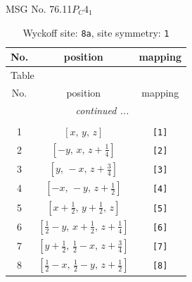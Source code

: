 \documentclass[fleqn,8pt]{jsarticle}
\begin{document}
\setcounter{MaxMatrixCols}{32}

\renewcommand{\tablename}{Table~}
\renewcommand{\figurename}{Figure~}
\begin{center}
\LARGE
MSG No. 76.11\quad$P_{C}4_{1}$
\end{center}
\renewcommand{\arraystretch}{1.2}
\begin{longtable}{ccc}
\caption{Wyckoff site: {\tt 8a}, site symmetry: {\tt 1}}
 \\
 \hline \hline
No. & position & mapping \\ \hline \endfirsthead

\multicolumn{2}{l}{\tablename\ \thetable{}} \\
 \hline \hline
No. & position & mapping \\ \hline \endhead

 \hline \hline
\multicolumn{2}{r}{\footnotesize\it continued ...} \\ \endfoot

 \hline \hline
\multicolumn{2}{r}{} \\ \endlastfoot

1 & $\left[ x,\, y,\, z \right]$ & {\tt [1]} \\ \hline
2 & $\left[ - y,\, x,\, z + \frac{1}{4} \right]$ & {\tt [2]} \\ \hline
3 & $\left[ y,\, - x,\, z + \frac{3}{4} \right]$ & {\tt [3]} \\ \hline
4 & $\left[ - x,\, - y,\, z + \frac{1}{2} \right]$ & {\tt [4]} \\ \hline
5 & $\left[ x + \frac{1}{2},\, y + \frac{1}{2},\, z \right]$ & {\tt [5]} \\ \hline
6 & $\left[ \frac{1}{2} - y,\, x + \frac{1}{2},\, z + \frac{1}{4} \right]$ & {\tt [6]} \\ \hline
7 & $\left[ y + \frac{1}{2},\, \frac{1}{2} - x,\, z + \frac{3}{4} \right]$ & {\tt [7]} \\ \hline
8 & $\left[ \frac{1}{2} - x,\, \frac{1}{2} - y,\, z + \frac{1}{2} \right]$ & {\tt [8]} \\
\end{longtable}
\end{document}

